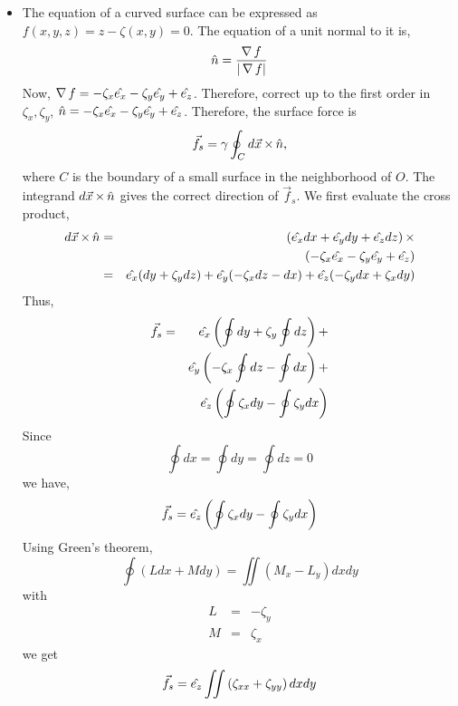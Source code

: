 \begin{itemize}
\item The equation of a curved surface can be expressed as $f(x, y, z) = z - \zeta(x, y) = 0$. The equation of a unit normal to it is,
\[
\hat{n} = \frac{\operatorname{\nabla}{f}}{|\operatorname{\nabla}{f}|}
\]
Now, $\operatorname{\nabla}{f} = -\zeta_x \hat{e_{x}} - \zeta_y \hat{e_{y}} + \hat{e_{z}}$. Therefore, correct up to the first order in $\zeta_x, \zeta_y$, $\hat{n} = -\zeta_x \hat{e_{x}} - \zeta_y \hat{e_{y}} + \hat{e_{z}}$.
Therefore, the surface force is
\[
\vec{f}_s = \gamma \oint_C d\vec{x} \operatorname{\times} \hat{n},
\]
where $C$ is the boundary of a small surface in the neighborhood of $O$. The integrand $d\vec{x} \operatorname{\times} \hat{n}$ gives the correct direction of $\vec{f}_s$. We first evaluate the cross
product,
\begin{eqnarray*}
d\vec{x} \operatorname{\times} \hat{n} &=& (\hat{e_{x}}dx + \hat{e_{y}}dy + \hat{e_{z}}dz) \operatorname{\times} \\
 & & (-\zeta_x \hat{e_{x}} - \zeta_y \hat{e_{y}} + \hat{e_{z}}) \\
 &=& \hat{e_{x}}(dy + \zeta_y dz) + \hat{e_{y}}(-\zeta_x dz - dx) + \hat{e_{z}}(-\zeta_y dx + \zeta_x dy)
\end{eqnarray*}
Thus,
\begin{eqnarray*}
\vec{f}_s &=& \hat{e_{x}}\left(\oint dy + \zeta_y \oint dz\right) + \\
 & & \hat{e_{y}}\left(-\zeta_x\oint dz - \oint dx\right) + \\
 & & \hat{e_{z}}\left(\oint \zeta_x dy - \oint \zeta_y dx \right)
\end{eqnarray*}
Since 
\[
\oint dx = \oint dy = \oint dz = 0
\]
we have,
\[
\vec{f}_s = \hat{e_{z}}\left(\oint \zeta_x dy - \oint \zeta_y dx \right)
\]
Using Green's theorem,
\[
\oint (Ldx + Mdy) = \iint (M_x - L_y)dxdy
\]
with 
\begin{eqnarray*}
L &=& -\zeta_y \\
M &=& \zeta_x
\end{eqnarray*}
we get
\begin{equation}\label{c1s7e1}
\vec{f}_s = \hat{e_{z}}\iint \left( \zeta_{xx} + \zeta_{yy} \right) dxdy
\end{equation}


\end{itemize}
